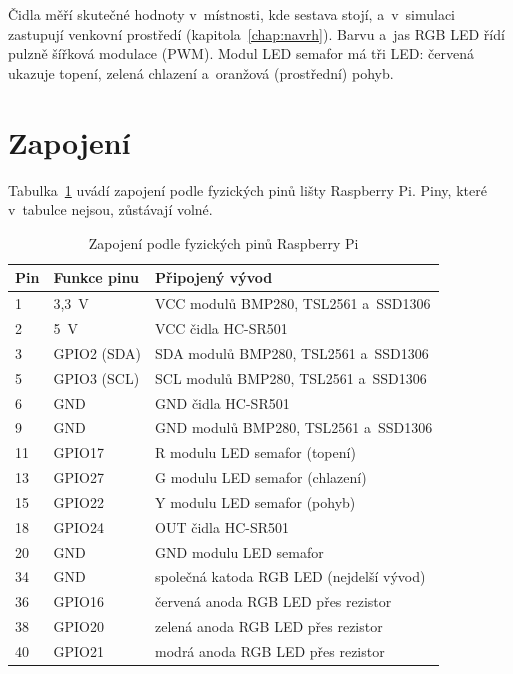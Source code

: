 Čidla měří skutečné hodnoty v~místnosti, kde sestava stojí, a~v~simulaci zastupují venkovní
prostředí (kapitola~\ref{chap:navrh}). Barvu a~jas RGB LED řídí pulzně šířková modulace (PWM).
Modul LED semafor má tři LED: červená ukazuje topení, zelená chlazení a~oranžová (prostřední)
pohyb.

\section{Zapojení}
\label{sec:zapojeni}

Tabulka~\ref{tab:zapojeni} uvádí zapojení podle fyzických pinů lišty Raspberry Pi. Piny, které
v~tabulce nejsou, zůstávají volné.

\begin{table}[H]
\centering
\caption{Zapojení podle fyzických pinů Raspberry Pi}
\label{tab:zapojeni}
\small
\begin{tabular}{|p{1.0cm}|p{3.2cm}|p{9.0cm}|}
\hline
\textbf{Pin} & \textbf{Funkce pinu} & \textbf{Připojený vývod} \\
\hline
1 & 3,3~V & VCC modulů BMP280, TSL2561 a~SSD1306 \\
\hline
2 & 5~V & VCC čidla HC-SR501 \\
\hline
3 & GPIO2 (SDA) & SDA modulů BMP280, TSL2561 a~SSD1306 \\
\hline
5 & GPIO3 (SCL) & SCL modulů BMP280, TSL2561 a~SSD1306 \\
\hline
6 & GND & GND čidla HC-SR501 \\
\hline
9 & GND & GND modulů BMP280, TSL2561 a~SSD1306 \\
\hline
11 & GPIO17 & R modulu LED semafor (topení) \\
\hline
13 & GPIO27 & G modulu LED semafor (chlazení) \\
\hline
15 & GPIO22 & Y modulu LED semafor (pohyb) \\
\hline
18 & GPIO24 & OUT čidla HC-SR501 \\
\hline
20 & GND & GND modulu LED semafor \\
\hline
34 & GND & společná katoda RGB LED (nejdelší vývod) \\
\hline
36 & GPIO16 & červená anoda RGB LED přes rezistor \\
\hline
38 & GPIO20 & zelená anoda RGB LED přes rezistor \\
\hline
40 & GPIO21 & modrá anoda RGB LED přes rezistor \\
\hline
\end{tabular}
\end{table}

